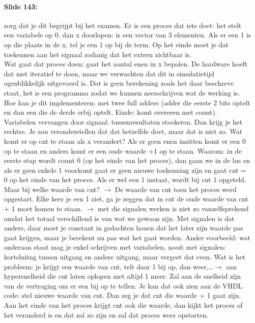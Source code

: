 \documentclass[10pt,a4paper]{book}
\begin{document}
\paragraph{Slide 143:} zorg dat je dit begrijpt bij het examen. Er is een proces dat iets doet: het stelt een variabele op 0, dan x doorlopen: is een vector van 3 elementen. Als er een 1 is op die plaats in de x, tel je een 1 op bij de term. Op het einde moet je dat toekennen aan het signaal zodanig dat het extern zichtbaar is.\\
Wat gaat dat proces doen: gaat het aantal enen in x bepalen. De hardware hoeft dat niet iteratief te doen, maar we verwachten dat dit in simulatietijd ogenblikkelijk uitgevoerd is. Dat is geen berekening zoals het daar beschreve staat, het is een programma zodat we kunnen neerschrijven wat de werking is.\\
Hoe kan je dit implementeren: met twee full adders (adder die eerste 2 bits optelt en dan een die de derde erbij optelt. Einde: komt overeeen met count).\\
Variabelen vervangen door signaal: tussenresultaten stockeren. Dan krijg je het rechtse. Je zou veronderstellen dat dat hetzelfde doet, maar dat is niet zo. Wat komt er op cnt te staan als x verandert? Als er geen enen inzitten komt er een 0 op te staan en anders komt er een oude waarde +1 op te staan. Waarom: in de eerste stap wordt count 0 (op het einde van het proces), dan gaan we in de lus en als er geen enkele 1 voorkomt gaat er geen nieuwe toekenning zijn en gaat cnt = 0 op het einde van het proces. Als er wel een 1 instaat, wordt bij cnt 1 opgeteld. Maar bij welke waarde van cnt? $\rightarrow$ De waarde van cnt toen het proces werd opgestart. Elke keer je een 1 ziet, ga je zeggen dat in cnt de oude waarde van cnt + 1 moet komen te staan. $\rightarrow$ met die signalen werken is niet zo vanzelfsprekend omdat het totaal verschillend is van wat we gewoon zijn. Met signalen is dat anders, daar moet je constant in gedachten houen dat het later zijn waarde pas gaat krijgen, maar je berekent nu pas wat het gaat worden. Ander voorbeeld: wat onderaan staat mag je enkel schrijven met variabelen, nooit met signalen: kortsluitng tussen uitgang en andere uitgang, maar vergeet dat even. Wat is het probleem: je krijgt een waarde van cnt, telt daar 1 bij op, dan weer,\ldots $\rightarrow$ aan hypersnelheid die cnt laten oplopen met altijd 1 meer. Zal aan de snelheid zijn van de vertraging om er een bij op te tellen. Je kan dat ook zien aan de VHDL code: stel nieuwe waarde van cnt. Dan zeg je dat cnt die waarde + 1 gaat zijn. Aan het einde van het proces krijgt cnt ook die waarde, dan kijkt het proces of het veranderd is en dat zal zo zijn en zal dat proces weer opstarten. 
\end{document}
